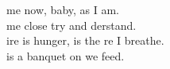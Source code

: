  me now, baby,  as I am. \\
 me close try and derstand. \\
ire is hunger, is the re I breathe. \\
 is a banquet on  we feed. \\

